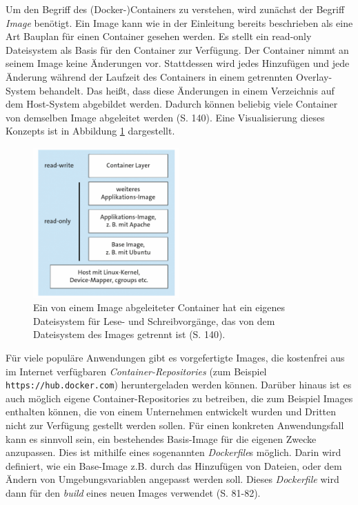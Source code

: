 \documentclass[11pt,a4paper]{article}
\begin{document}
Um den Begriff des (Docker-)Containers zu verstehen, wird zunächst der Begriff \emph{Image} benötigt.
Ein Image kann wie in der Einleitung bereits beschrieben als eine Art Bauplan für einen Container gesehen werden.
Es stellt ein read-only Dateisystem als Basis für den Container zur Verfügung. Der Container nimmt an seinem Image
keine Änderungen vor. Stattdessen wird jedes Hinzufügen und jede Änderung während der Laufzeit des Containers in einem
getrennten Overlay-System behandelt.
Das heißt, dass diese Änderungen in einem Verzeichnis auf dem Host-System abgebildet werden.
Dadurch können beliebig viele Container von demselben Image abgeleitet werden \cite{kofler2021docker} (S. 140).
Eine Visualisierung dieses Konzepts ist in Abbildung \ref{fig:overlay} dargestellt.

\begin{figure}[h]
  \centering
  \includegraphics[width=0.5\textwidth]{./media/kofler2021docker S.140.png}
  \caption{Ein von einem Image abgeleiteter Container hat ein eigenes Dateisystem für Lese- und Schreibvorgänge, das
    von dem Dateisystem des Images getrennt ist \cite{kofler2021docker} (S. 140).}
  \label{fig:overlay}
\end{figure}

Für viele populäre Anwendungen gibt es vorgefertigte Images, die kostenfrei aus im Internet verfügbaren
\emph{Container-Repositories} (zum Beispiel \lstinline|https://hub.docker.com|) heruntergeladen werden können.
Darüber hinaus ist es auch möglich eigene Container-Repositories zu betreiben,
die zum Beispiel Images enthalten können, die von einem Unternehmen entwickelt wurden
und Dritten nicht zur Verfügung gestellt werden sollen.
Für einen konkreten Anwendungsfall kann es sinnvoll sein, ein bestehendes Basis-Image für die eigenen Zwecke anzupassen.
Dies ist mithilfe eines sogenannten \emph{Dockerfile}s möglich. Darin wird definiert, wie ein Base-Image z.B. durch das Hinzufügen von Dateien,
oder dem Ändern von Umgebungsvariablen angepasst werden soll. Dieses \emph{Dockerfile} wird dann für den \emph{build}
eines neuen Images verwendet \cite{kofler2021docker} (S. 81-82).
\end{document}

